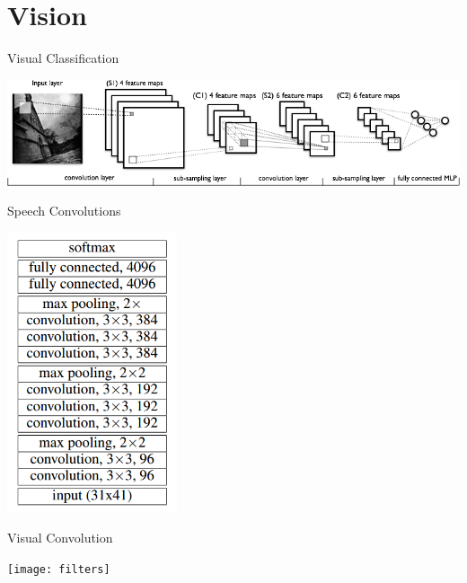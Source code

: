 \documentclass{beamer}
\begin{document}
{

}

{

}


{

}

{

}

{

}

\section{Vision}
\begin{frame}{Visual Classification}
  \begin{center}
    \includegraphics[width=\textwidth]{mylenet}
  \end{center}
\end{frame}


\begin{frame}{Speech Convolutions}
  \begin{center}
    \includegraphics[width=5cm]{speechconv}
  \end{center}
  
\end{frame}

\begin{frame}{Visual Convolution}
  \begin{center}
    \texttt{[image: filters]}
  \end{center}
  
\end{frame}
\end{document}
